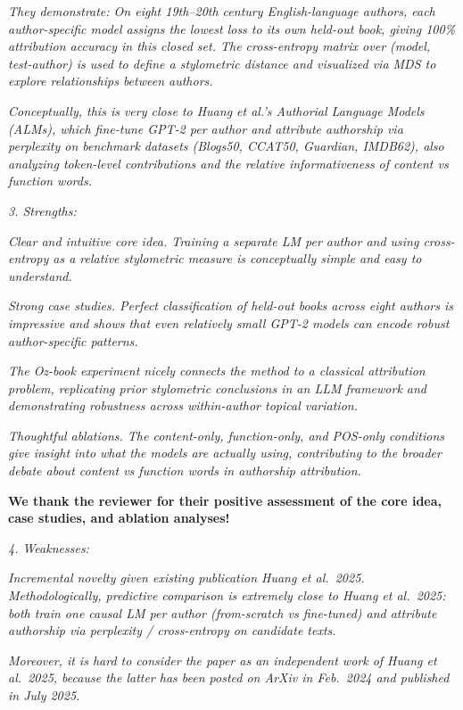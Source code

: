 \documentclass[11pt]{article}
\begin{document}
\textit{They demonstrate: On eight 19th--20th century English-language authors,
each author-specific model assigns the lowest loss to its own held-out book,
giving 100\% attribution accuracy in this closed set. The cross-entropy matrix
over (model, test-author) is used to define a stylometric distance and
visualized via MDS to explore relationships between authors.}

\textit{Conceptually, this is very close to Huang et al.'s Authorial Language
Models (ALMs), which fine-tune GPT-2 per author and attribute authorship via
perplexity on benchmark datasets (Blogs50, CCAT50, Guardian, IMDB62), also
analyzing token-level contributions and the relative informativeness of content
vs function words.}

\textit{3. Strengths:}

\textit{Clear and intuitive core idea. Training a separate LM per author and
using cross-entropy as a relative stylometric measure is conceptually simple
and easy to understand.}

\textit{Strong case studies. Perfect classification of held-out books across
eight authors is impressive and shows that even relatively small GPT-2 models
can encode robust author-specific patterns.}

\textit{The Oz-book experiment nicely connects the method to a classical
attribution problem, replicating prior stylometric conclusions in an LLM
framework and demonstrating robustness across within-author topical variation.}

\textit{Thoughtful ablations. The content-only, function-only, and POS-only
conditions give insight into what the models are actually using, contributing
to the broader debate about content vs function words in authorship
attribution.}

\textbf{We thank the reviewer for their positive assessment of the core idea,
case studies, and ablation analyses!}

\textit{4. Weaknesses:}

\textit{Incremental novelty given existing publication Huang et al.\ 2025. Methodologically, predictive comparison is extremely close to Huang et al.\ 2025: both train one causal LM per author (from-scratch vs fine-tuned) and attribute authorship via perplexity / cross-entropy on candidate texts.}

\textit{Moreover, it is hard to consider the paper as an independent work of Huang et al.\ 2025, because the latter has been posted on ArXiv in Feb.\ 2024 and published in July 2025.}
\end{document}
